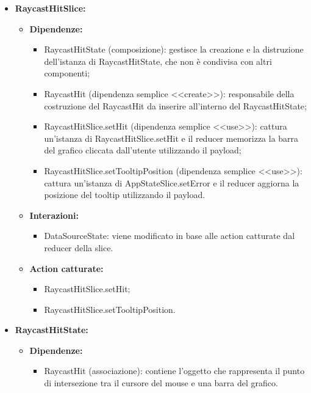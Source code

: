 \begin{itemize}
    \item \textbf{RaycastHitSlice:}
    \begin{itemize}
        \item \textbf{Dipendenze:}
        \begin{itemize}
            \item RaycastHitState (composizione): gestisce la creazione e la distruzione dell'istanza di RaycastHitState, che non è condivisa con altri componenti;
            \item RaycastHit (dipendenza semplice <<create>>): responsabile della costruzione del RaycastHit da inserire all’interno del RaycastHitState;
            \item RaycastHitSlice.setHit (dipendenza semplice <<use>>): cattura un’istanza di RaycastHitSlice.setHit e il reducer memorizza la barra del grafico cliccata dall'utente utilizzando il payload;
            \item RaycastHitSlice.setTooltipPosition (dipendenza semplice <<use>>): cattura un’istanza di AppStateSlice.setError e il reducer aggiorna la posizione del tooltip utilizzando il payload.
        \end{itemize} 
        \item \textbf{Interazioni:}
        \begin{itemize}
            \item DataSourceState: viene modificato in base alle action catturate dal reducer della slice.
        \end{itemize} 
        \item \textbf{Action catturate:}
        \begin{itemize}
            \item RaycastHitSlice.setHit;
            \item RaycastHitSlice.setTooltipPosition.
        \end{itemize} 
    \end{itemize}

    
    \item \textbf{RaycastHitState:}
    \begin{itemize}
        \item \textbf{Dipendenze:}
        \begin{itemize}
            \item RaycastHit (associazione): contiene l'oggetto che rappresenta il punto di intersezione tra il cursore del mouse e una barra del grafico.
        \end{itemize} 
    \end{itemize}


\end{itemize}
